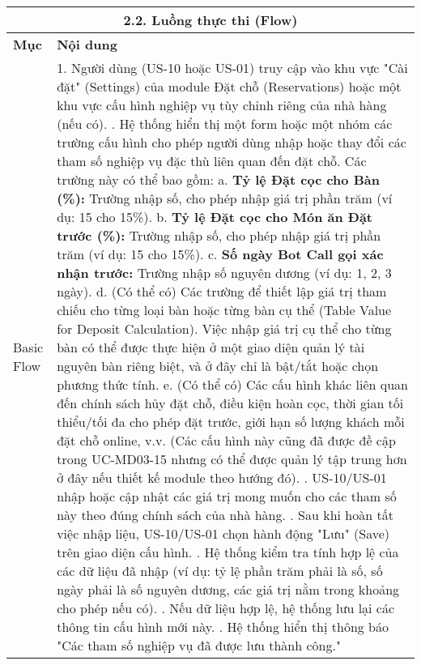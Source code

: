 \begin{longtable}{|m{4cm}|p{11cm}|}
\hline
\multicolumn{2}{|c|}{\textbf{2.2. Luồng thực thi (Flow)}} \\
\hline
\textbf{Mục} & \textbf{Nội dung} \\
\hline
Basic Flow & 1. Người dùng (US-10 hoặc US-01) truy cập vào khu vực "Cài đặt" (Settings) của module Đặt chỗ (Reservations) hoặc một khu vực cấu hình nghiệp vụ tùy chỉnh riêng của nhà hàng (nếu có). \newline 2. Hệ thống hiển thị một form hoặc một nhóm các trường cấu hình cho phép người dùng nhập hoặc thay đổi các tham số nghiệp vụ đặc thù liên quan đến đặt chỗ. Các trường này có thể bao gồm: \newline    a. \textbf{Tỷ lệ Đặt cọc cho Bàn (\%):} Trường nhập số, cho phép nhập giá trị phần trăm (ví dụ: 15 cho 15\%). \newline    b. \textbf{Tỷ lệ Đặt cọc cho Món ăn Đặt trước (\%):} Trường nhập số, cho phép nhập giá trị phần trăm (ví dụ: 15 cho 15\%). \newline    c. \textbf{Số ngày Bot Call gọi xác nhận trước:} Trường nhập số nguyên dương (ví dụ: 1, 2, 3 ngày). \newline    d. (Có thể có) Các trường để thiết lập giá trị tham chiếu cho từng loại bàn hoặc từng bàn cụ thể (Table Value for Deposit Calculation). Việc nhập giá trị cụ thể cho từng bàn có thể được thực hiện ở một giao diện quản lý tài nguyên bàn riêng biệt, và ở đây chỉ là bật/tắt hoặc chọn phương thức tính. \newline    e. (Có thể có) Các cấu hình khác liên quan đến chính sách hủy đặt chỗ, điều kiện hoàn cọc, thời gian tối thiểu/tối đa cho phép đặt trước, giới hạn số lượng khách mỗi đặt chỗ online, v.v. (Các cấu hình này cũng đã được đề cập trong UC-MD03-15 nhưng có thể được quản lý tập trung hơn ở đây nếu thiết kế module theo hướng đó). \newline 3. US-10/US-01 nhập hoặc cập nhật các giá trị mong muốn cho các tham số này theo đúng chính sách của nhà hàng. \newline 4. Sau khi hoàn tất việc nhập liệu, US-10/US-01 chọn hành động "Lưu" (Save) trên giao diện cấu hình. \newline 5. Hệ thống kiểm tra tính hợp lệ của các dữ liệu đã nhập (ví dụ: tỷ lệ phần trăm phải là số, số ngày phải là số nguyên dương, các giá trị nằm trong khoảng cho phép nếu có). \newline 6. Nếu dữ liệu hợp lệ, hệ thống lưu lại các thông tin cấu hình mới này. \newline 7. Hệ thống hiển thị thông báo "Các tham số nghiệp vụ đã được lưu thành công." \\

\end{longtable}
